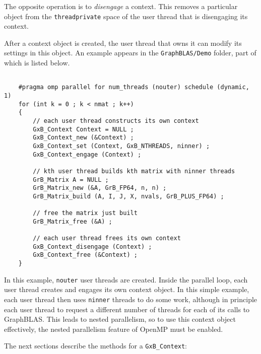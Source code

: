 \documentclass[12pt]{article}
\begin{document}
The opposite operation is to {\em disengage} a context.  This removes a
particular object from the \verb'threadprivate' space of the user thread
that is disengaging its context.

After a context object is created, the user thread that owns it can modify
its settings in this object.  An example appears in the \verb'GraphBLAS/Demo'
folder, part of which is listed below.

{\footnotesize
\begin{verbatim}

    #pragma omp parallel for num_threads (nouter) schedule (dynamic, 1)
    for (int k = 0 ; k < nmat ; k++)
    {
        // each user thread constructs its own context
        GxB_Context Context = NULL ;
        GxB_Context_new (&Context) ;
        GxB_Context_set (Context, GxB_NTHREADS, ninner) ;
        GxB_Context_engage (Context) ;

        // kth user thread builds kth matrix with ninner threads
        GrB_Matrix A = NULL ;
        GrB_Matrix_new (&A, GrB_FP64, n, n) ;
        GrB_Matrix_build (A, I, J, X, nvals, GrB_PLUS_FP64) ;

        // free the matrix just built
        GrB_Matrix_free (&A) ;

        // each user thread frees its own context
        GxB_Context_disengage (Context) ;
        GxB_Context_free (&Context) ;
    }
\end{verbatim}
}

In this example, \verb'nouter' user threads are created.  Inside the parallel
loop, each user thread creates and engages its own context object.  In this
simple example, each user thread then uses \verb'ninner' threads to do some
work, although in principle each user thread to request a different number of
threads for each of its calls to GraphBLAS.  This leads to nested parallelism,
so to use this context object effectively, the nested parallelism feature of
OpenMP must be enabled.

The next sections describe the methods for a \verb'GxB_Context':
\end{document}

